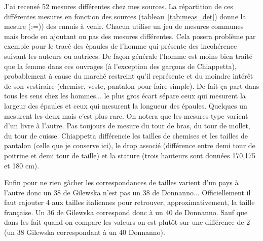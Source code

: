 \documentclass[10pt,a4paper,twoside]{report}
\begin{document}
J'ai recensé 52 mesures différentes chez mes sources. La répartition de ces différentes mesures en fonction des sources (tableau~\ref{tab:meas_det}) donne la mesure (:=)) des ennuis à venir. Chacun utilise un jeu de mesures communes mais brode en ajoutant ou pas des mesures différentes. Cela posera problème par exemple pour le tracé des épaules de l'homme qui présente des incohérence suivant les auteurs ou autrices. De façon générale l'homme est moins bien traité que la femme dans ces ouvrages (à l'exception des garçons de Chiappetta), probablement à cause du marché restreint qu'il représente et du moindre intérêt de son vestiraire (chemise, veste, pantalon pour faire simple). De fait ça part dans tous les sens chez les hommes... le plus gros écart sépare ceux qui mesurent la largeur des épaules et ceux qui mesurent la longueur des épaules. Quelques un mesurent les deux mais c'est plus rare. On notera que les mesures type varient d'un livre à l'autre. Pas toujours de mesure du tour de bras, du tour de mollet, du tour de cuisse. Chiappetta différencie les tailles de chemises et les tailles de pantalon (celle que je conserve ici), le drop associé (différence entre demi tour de poitrine et demi tour de taille) et la stature (trois hauteurs sont données 170,175 et 180 cm).

Enfin pour ne rien gâcher les correspondances de tailles varient d'un pays à l'autre donc un 38 de Gilewska n'est pas un 38 de Donnanno... Officiellement il faut rajouter 4 aux tailles italiennes pour retrouver, approximativement, la taille française. Un 36 de Gilewska correspond donc à un 40 de Donnanno. Sauf que dans les fait quand on compare les valeurs on est plutôt sur une différence de 2 (un 38 Gilewska correspondant à un 40 Donnanno).
\end{document}
